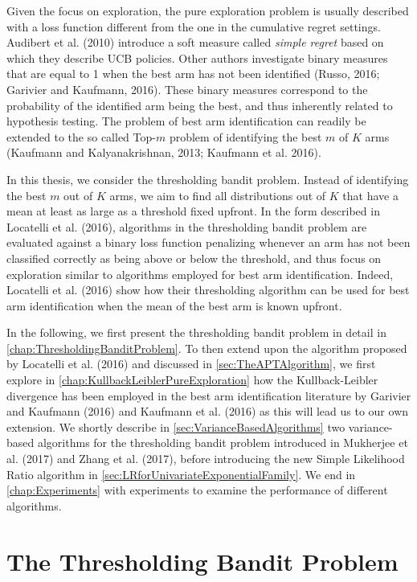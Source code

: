 \documentclass[11pt,]{article}
\begin{document}
Given the focus on exploration, the pure exploration problem is usually
described with a loss function different from the one in the cumulative
regret settings. Audibert et al. (2010) introduce a soft measure called
\emph{simple regret} based on which they describe UCB policies. Other
authors investigate binary measures that are equal to 1 when the best
arm has not been identified (Russo, 2016; Garivier and Kaufmann, 2016).
These binary measures correspond to the probability of the identified
arm being the best, and thus inherently related to hypothesis testing.
The problem of best arm identification can readily be extended to the so
called Top-\(m\) problem of identifying the best \(m\) of \(K\) arms
(Kaufmann and Kalyanakrishnan, 2013; Kaufmann et al. 2016).

In this thesis, we consider the thresholding bandit problem. Instead of
identifying the best \(m\) out of \(K\) arms, we aim to find all
distributions out of \(K\) that have a mean at least as large as a
threshold fixed upfront. In the form described in Locatelli et al.
(2016), algorithms in the thresholding bandit problem are evaluated
against a binary loss function penalizing whenever an arm has not been
classified correctly as being above or below the threshold, and thus
focus on exploration similar to algorithms employed for best arm
identification. Indeed, Locatelli et al. (2016) show how their
thresholding algorithm can be used for best arm identification when the
mean of the best arm is known upfront.

In the following, we first present the thresholding bandit problem in
detail in \autoref{chap:ThresholdingBanditProblem}. To then extend upon
the algorithm proposed by Locatelli et al. (2016) and discussed in
\autoref{sec:TheAPTAlgorithm}, we first explore in
\autoref{chap:KullbackLeiblerPureExploration} how the Kullback-Leibler
divergence has been employed in the best arm identification literature
by Garivier and Kaufmann (2016) and Kaufmann et al. (2016) as this will
lead us to our own extension. We shortly describe in
\autoref{sec:VarianceBasedAlgorithms} two variance-based algorithms for
the thresholding bandit problem introduced in Mukherjee et al. (2017)
and Zhang et al. (2017), before introducing the new Simple Likelihood
Ratio algorithm in \autoref{sec:LRforUnivariateExponentialFamily}. We
end in \autoref{chap:Experiments} with experiments to examine the
performance of different algorithms.

\newpage

\section{\texorpdfstring{The Thresholding Bandit Problem
\label{chap:ThresholdingBanditProblem}}{The Thresholding Bandit Problem }}\label{the-thresholding-bandit-problem}
\end{document}
